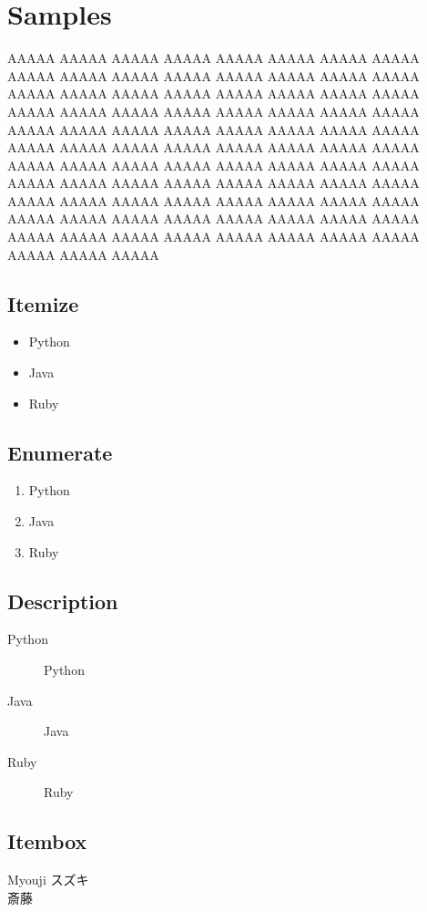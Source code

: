 \section{Samples} \label{section:samples}

AAAAA AAAAA AAAAA AAAAA AAAAA AAAAA AAAAA AAAAA AAAAA AAAAA AAAAA AAAAA AAAAA
AAAAA AAAAA AAAAA AAAAA AAAAA AAAAA AAAAA AAAAA AAAAA AAAAA AAAAA AAAAA AAAAA
AAAAA AAAAA AAAAA AAAAA AAAAA AAAAA AAAAA AAAAA AAAAA AAAAA AAAAA AAAAA AAAAA
AAAAA AAAAA AAAAA AAAAA AAAAA AAAAA AAAAA AAAAA AAAAA AAAAA AAAAA AAAAA AAAAA
AAAAA AAAAA AAAAA AAAAA AAAAA AAAAA AAAAA AAAAA AAAAA AAAAA AAAAA AAAAA AAAAA
AAAAA AAAAA AAAAA AAAAA AAAAA AAAAA AAAAA AAAAA AAAAA AAAAA AAAAA AAAAA AAAAA
AAAAA AAAAA AAAAA AAAAA AAAAA AAAAA AAAAA AAAAA AAAAA AAAAA AAAAA AAAAA AAAAA

\subsection{Itemize}
\begin{itemize}
	\item Python
	\item Java
	\item Ruby
\end{itemize}

\subsection{Enumerate}
\begin{enumerate}
	\item Python
	\item Java
	\item Ruby
\end{enumerate}

\subsection{Description}
\begin{description}
	\item[Python] Python
	\item[Java]   Java
	\item[Ruby]   Ruby
\end{description}

\subsection{Itembox}
\begin{itembox}[l]{Myouji}
	スズキ\\
	斎藤
\end{itembox}

